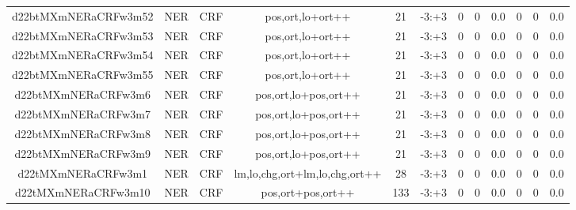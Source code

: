 \documentclass[a4paper]{article}
\begin{document}
\begin{landscape}
\begin{center}
\begin{tabular}{ |c|c|c|c|c|c|c|c|c|c|c|c|}
 
 	
 	\small{ d22btMXmNERaCRFw3m52 } & \small{ NER} & \small{  CRF }  & pos,ort,lo+ort++  &  21 &  \small{  -3:+3 }  &  0 & 0 & 0.0  &  0 & 0 & 0.0 \\
 	

 
 	
 	\small{ d22btMXmNERaCRFw3m53 } & \small{ NER} & \small{  CRF }  & pos,ort,lo+ort++  &  21 &  \small{  -3:+3 }  &  0 & 0 & 0.0  &  0 & 0 & 0.0 \\
 	

 
 	
 	\small{ d22btMXmNERaCRFw3m54 } & \small{ NER} & \small{  CRF }  & pos,ort,lo+ort++  &  21 &  \small{  -3:+3 }  &  0 & 0 & 0.0  &  0 & 0 & 0.0 \\
 	

 
 	
 	\small{ d22btMXmNERaCRFw3m55 } & \small{ NER} & \small{  CRF }  & pos,ort,lo+ort++  &  21 &  \small{  -3:+3 }  &  0 & 0 & 0.0  &  0 & 0 & 0.0 \\
 	

 
 	
 	\small{ d22btMXmNERaCRFw3m6 } & \small{ NER} & \small{  CRF }  & pos,ort,lo+pos,ort++  &  21 &  \small{  -3:+3 }  &  0 & 0 & 0.0  &  0 & 0 & 0.0 \\
 	

 
 	
 	\small{ d22btMXmNERaCRFw3m7 } & \small{ NER} & \small{  CRF }  & pos,ort,lo+pos,ort++  &  21 &  \small{  -3:+3 }  &  0 & 0 & 0.0  &  0 & 0 & 0.0 \\
 	

 
 	
 	\small{ d22btMXmNERaCRFw3m8 } & \small{ NER} & \small{  CRF }  & pos,ort,lo+pos,ort++  &  21 &  \small{  -3:+3 }  &  0 & 0 & 0.0  &  0 & 0 & 0.0 \\
 	

 
 	
 	\small{ d22btMXmNERaCRFw3m9 } & \small{ NER} & \small{  CRF }  & pos,ort,lo+pos,ort++  &  21 &  \small{  -3:+3 }  &  0 & 0 & 0.0  &  0 & 0 & 0.0 \\
 	

 
 	
 	\small{ d22tMXmNERaCRFw3m1 } & \small{ NER} & \small{  CRF }  & lm,lo,chg,ort+lm,lo,chg,ort++  &  28 &  \small{  -3:+3 }  &  0 & 0 & 0.0  &  0 & 0 & 0.0 \\
 	

 
 	
 	\small{ d22tMXmNERaCRFw3m10 } & \small{ NER} & \small{  CRF }  & pos,ort+pos,ort++  &  133 &  \small{  -3:+3 }  &  0 & 0 & 0.0  &  0 & 0 & 0.0 \\
 	


\end{tabular}
\end{center}
\end{landscape}
\end{document}
